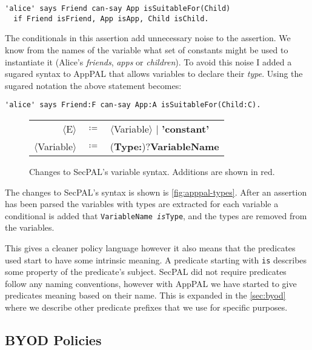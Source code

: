 \documentclass[a4paper]{scrartcl}
\newcommand{\new}[1]{{\color{BrickRed}#1}}
\begin{document}
\begin{lstlisting}
'alice' says Friend can-say App isSuitableFor(Child)
  if Friend isFriend, App isApp, Child isChild.
\end{lstlisting}

The conditionals in this assertion add unnecessary noise to the assertion. We
know from the names of the variable what set of constants might be used
to instantiate it (Alice's \emph{friends}, \emph{apps} or \emph{children}). To
avoid this noise I added a sugared syntax to AppPAL that allows variables to
declare their \emph{type}. Using the sugared notation the above statement
becomes:

\begin{lstlisting}
'alice' says Friend:F can-say App:A isSuitableFor(Child:C).
\end{lstlisting}

\begin{figure}
  \newcommand{\nonterminal}[1]{$\langle$#1$\rangle$}
  \newcommand{\terminal}[1]{\textbf{#1}}
  \begin{tabular}{r c l}
    \footnotesize
    \nonterminal{E}         & $\coloneqq$ & \nonterminal{Variable} $\vert$ \terminal{'constant'} \\
    \nonterminal{Variable}  & $\coloneqq$ & \new{(\terminal{Type}\terminal{:})?}\terminal{VariableName}
  \end{tabular}
  \caption{Changes to SecPAL's variable syntax.  Additions are shown in \new{red}.}
  \label{fig:apppal-types}
\end{figure}
The changes to SecPAL's syntax is shown is \autoref{fig:apppal-types}.
After an assertion has been parsed the variables with types are extracted for
each variable a conditional is added that \texttt{VariableName \emph{is}Type},
and the types are removed from the variables.

This gives a cleaner policy language however it also means that the predicates
used start to have some intrinsic meaning.  A predicate starting with
\texttt{is} describes some property of the predicate's subject.
SecPAL did not require predicates follow any naming conventions, however with
AppPAL we have started to give predicates meaning based on their name.
This is expanded in the \autoref{sec:byod} where we describe other predicate
prefixes that we use for specific purposes.

\subsection{BYOD Policies}
\label{sec:byod}
\end{document}
